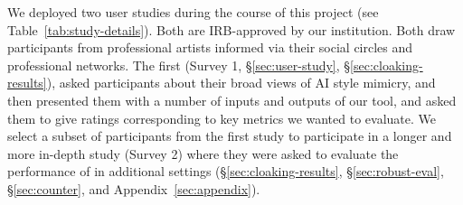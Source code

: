 We deployed two user studies during the course of this project (see
Table~\ref{tab:study-details}). Both are IRB-approved by our institution.  Both
draw participants from professional artists informed via their social circles
and professional networks. The first (Survey 1, \S\ref{sec:user-study},
\S\ref{sec:cloaking-results}), asked participants
about their broad views of AI style mimicry, and then presented them with a
number of inputs and outputs of our tool, and asked them to give ratings
corresponding to key metrics we wanted to evaluate. We select a subset 
of participants from the first study to participate in a 
longer and more in-depth study (Survey 2) where 
they were asked to evaluate the performance of \system{} in 
additional settings (\S\ref{sec:cloaking-results}, \S\ref{sec:robust-eval}, 
\S\ref{sec:counter}, and Appendix~\ref{sec:appendix}). 


\begin{table}[t]
  \centering
  \vspace{-0.1in}
  \caption{Information on our user studies: the number of artist participants
    and where we report the results of the studies. We sent Survey 2 to
    some specific participants from survey 1 who volunteered to participate in a
    followup study.}
  \label{tab:study-details}
\end{table}


